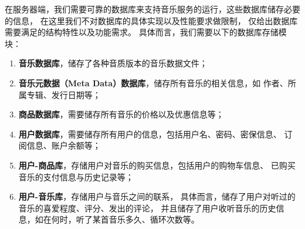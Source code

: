 在服务器端，我们需要可靠的数据库来支持音乐服务的运行，这些数据库储存必要的信息，
    在这里我们不对数据库的具体实现以及性能要求做限制，
    仅给出数据库需要满足的结构特性以及功能需求。
具体而言，我们需要以下的数据库存储模块：
    \begin{enumerate}
        \item \textbf{音乐数据库}，储存了各种音质版本的音乐数据文件；
        \item \textbf{音乐元数据（Meta Data）数据库}，储存所有音乐的相关信息，如
            作者、所属专辑、发行日期等；
        \item \textbf{商品数据库}，需要储存所有音乐的价格以及优惠信息等；
        \item \textbf{用户数据库}，需要储存所有用户的信息，包括用户名、密码、密保信息、
            订阅信息、账户余额等；
        \item \textbf{用户-商品库}，存储用户对音乐的购买信息，包括用户的购物车信息、
            已购买音乐的支付信息与历史记录等；
        \item \textbf{用户-音乐库}，存储用户与音乐之间的联系，
            具体而言，储存了用户对听过的音乐的喜爱程度、评分、发出的评论，
            并且储存了用户收听音乐的历史信息，如在何时，听了某首音乐多久、循环次数等。
    \end{enumerate}

